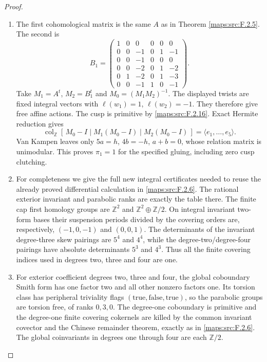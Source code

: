 \documentclass[11pt,a4paper]{article}
\theoremstyle{definition}
\begin{document}
\begin{proof}
\begin{enumerate}[label=\arabic*.]
\item The first cohomological matrix is the same $A$ as in
Theorem \ref{maps:src:F.2.5}.  The second is
\[
 B_1=\begin{pmatrix}
 1&0&0&0&0&0\\
 0&0&-1&0&1&-1\\
 0&0&-1&0&0&0\\
 0&0&-2&0&1&-2\\
 0&1&-2&0&1&-3\\
 0&0&-1&1&0&-1
 \end{pmatrix}.
 \tag{F.U11}\label{maps:eq:F.U11}
\]
Take $M_1=A^t$, $M_2=B_1^t$ and
$M_0=(M_1M_2)^{-1}$.  The displayed twists are fixed integral
vectors with $\ell(w_1)=1$, $\ell(w_2)=-1$.
They therefore give free affine actions.  The cusp is
primitive by \ref{maps:src:F.2.16}.  Exact Hermite reduction gives
\[
 \operatorname{col}_{\mathbb Z}
 [\,M_0-I\mid M_1(M_0-I)\mid M_2(M_0-I)\,]
       =\langle e_1,\ldots,e_5\rangle.
\]
Van Kampen leaves only $5a=h$, $4b=-h$, $a+b=0$,
whose relation matrix is unimodular.  This proves
$\pi_1=1$ for the specified gluing, including zero cusp
clutching.

\item For completeness we give the full new integral certificates
needed to reuse the already proved differential calculation
in \ref{maps:src:F.2.6}.  The rational exterior invariant and parabolic ranks
are exactly the table there.  The finite cap first homology
groups are $\mathbb Z^2$ and $\mathbb Z^2\oplus\mathbb Z/2$.
On integral invariant two-form bases their suspension periods
divided by the covering orders are, respectively,
$(-1,0,-1)$ and $(0,0,1)$.  The determinants of the invariant
degree-three skew pairings are $5^4$ and $4^4$, while the
degree-two/degree-four pairings have absolute determinants
$5^3$ and $4^3$.  Thus all the finite covering indices used
in degrees two, three and four are one.

\item For exterior coefficient degrees two, three and four, the
global coboundary Smith form has one factor two and all other
nonzero factors one.  Its torsion class has peripheral
triviality flags $(\mathrm{true},\mathrm{false},\mathrm{true})$,
so the parabolic groups are torsion free, of ranks $0,3,0$.
The degree-one coboundary is primitive and the degree-one
finite covering cokernels are killed by the common invariant
covector and the Chinese remainder theorem, exactly as in
\ref{maps:src:F.2.6}.  The global coinvariants in degrees one through four
are each $\mathbb Z/2$.


\end{enumerate}
\end{proof}
\end{document}
